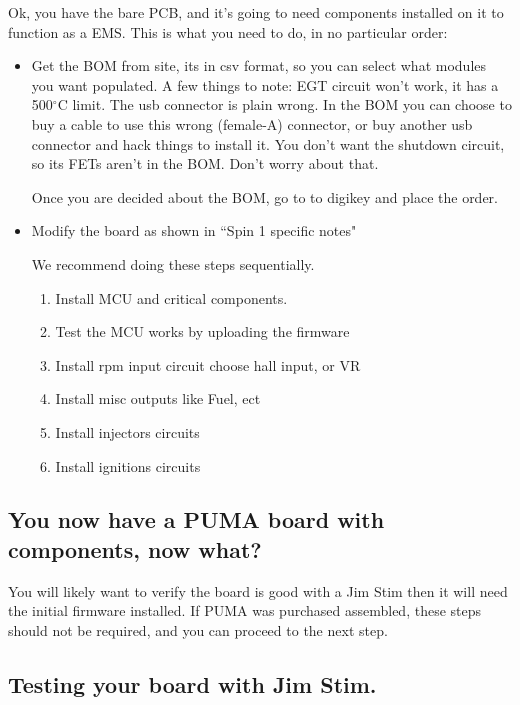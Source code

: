 \documentclass[12pt,a4paper,titlepage]{article}
\begin{document}
Ok, you have the bare PCB, and it's going to need components installed on it to function as a EMS. This is what you need to do, in no particular order:
\begin{itemize}
\item Get the BOM from site, its in csv format, so you can select what modules you want populated.
A few things to note:
EGT circuit won't work, it has a 500$^{\circ}$C limit.
The usb connector is plain wrong. In the BOM you can choose to buy a cable to use this wrong (female-A) connector, or buy another usb connector and hack things to install it.
You don't want the shutdown circuit, so its FETs aren't in the BOM. Don't worry about that.

Once you are decided about the BOM, go to to digikey and place the order.

\item Modify the board as shown in ``Spin 1 specific notes"

We recommend doing these steps sequentially.

\begin{enumerate}
\item Install MCU and critical components.
\item Test the MCU works by uploading the firmware
\item Install rpm input circuit choose hall input, or VR
\item Install misc outputs like Fuel, ect
\item Install injectors circuits
\item Install ignitions circuits
\end{enumerate}

\end{itemize}

\subsection{You now have a PUMA board with components, now what?}

You will likely want to verify the board is good with a Jim Stim  then it will need the initial firmware installed. If PUMA was purchased assembled, these steps should not be required, and you can proceed to the next step.

\subsection{Testing your board with Jim Stim.}
\end{document}

